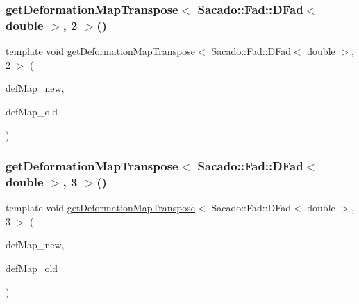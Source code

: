 \subsubsection{\texorpdfstring{getDeformationMapTranspose$<$ Sacado::Fad::DFad$<$ double $>$, 2 $>$()}{getDeformationMapTranspose< Sacado::Fad::DFad< double >, 2 >()}}
{\footnotesize\ttfamily template void \mbox{\hyperlink{group___evaluation_functions_gad4003712a2346a79e13bdbfcad4d1e1c}{get\+Deformation\+Map\+Transpose}}$<$ Sacado\+::\+Fad\+::\+D\+Fad$<$ double $>$, 2 $>$ (\begin{DoxyParamCaption}\item[{\mbox{\hyperlink{structdeformation_map}{deformation\+Map}}$<$ Sacado\+::\+Fad\+::\+D\+Fad$<$ double $>$, 2 $>$ \&}]{def\+Map\+\_\+new,  }\item[{\mbox{\hyperlink{structdeformation_map}{deformation\+Map}}$<$ Sacado\+::\+Fad\+::\+D\+Fad$<$ double $>$, 2 $>$ \&}]{def\+Map\+\_\+old }\end{DoxyParamCaption})}

\mbox{\label{function_evaluations_8cc_afa134cc0a430399a7c20d2d82dd652bb}} 
\subsubsection{\texorpdfstring{getDeformationMapTranspose$<$ Sacado::Fad::DFad$<$ double $>$, 3 $>$()}{getDeformationMapTranspose< Sacado::Fad::DFad< double >, 3 >()}}
{\footnotesize\ttfamily template void \mbox{\hyperlink{group___evaluation_functions_gad4003712a2346a79e13bdbfcad4d1e1c}{get\+Deformation\+Map\+Transpose}}$<$ Sacado\+::\+Fad\+::\+D\+Fad$<$ double $>$, 3 $>$ (\begin{DoxyParamCaption}\item[{\mbox{\hyperlink{structdeformation_map}{deformation\+Map}}$<$ Sacado\+::\+Fad\+::\+D\+Fad$<$ double $>$, 3 $>$ \&}]{def\+Map\+\_\+new,  }\item[{\mbox{\hyperlink{structdeformation_map}{deformation\+Map}}$<$ Sacado\+::\+Fad\+::\+D\+Fad$<$ double $>$, 3 $>$ \&}]{def\+Map\+\_\+old }\end{DoxyParamCaption})}

